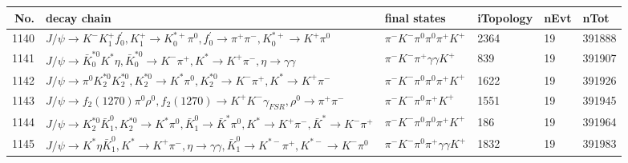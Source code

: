 \begin{table}[htbp] 
\begin{center}
\begin{small}
\begin{tabular}{rlllll}\hline\hline
 No. & decay chain & final states &  iTopology & nEvt & nTot \\\hline
1140&$J/\psi       \rightarrow K^{-}          K_1^{+}        f^{'}_{0}     , K_1^{+}         \rightarrow K_{0}^{*+}     \pi^{0}        , f^{'}_{0}      \rightarrow \pi^{+}        \pi^{-}        , K_{0}^{*+}      \rightarrow K^{+}          \pi^{0}        $&$\pi^{-}        K^{-}          \pi^{0}        \pi^{0}        \pi^{+}        K^{+}          $& 2364&   19&391888\\
1141&$J/\psi       \rightarrow \bar{K}_0^{*0}K^{*}          \eta          , \bar{K}_0^{*0} \rightarrow K^{-}          \pi^{+}        , K^{*}           \rightarrow K^{+}          \pi^{-}        , \eta           \rightarrow \gamma       \gamma       $&$\pi^{-}        K^{-}          \pi^{+}        \gamma       \gamma       K^{+}          $&  839&   19&391907\\
1142&$J/\psi       \rightarrow \pi^{0}        K_2^{*0}       K_2^{*0}       , K_2^{*0}        \rightarrow K^{*}          \pi^{0}        , K_2^{*0}        \rightarrow K^{-}          \pi^{+}        , K^{*}           \rightarrow K^{+}          \pi^{-}        $&$\pi^{-}        K^{-}          \pi^{0}        \pi^{0}        \pi^{+}        K^{+}          $& 1622&   19&391926\\
1143&$J/\psi       \rightarrow f_{2}(1270)    \pi^{0}        \rho^{0}      , f_{2}(1270)     \rightarrow K^{+}          K^{-}          \gamma_{FSR} , \rho^{0}       \rightarrow \pi^{+}        \pi^{-}        $&$\pi^{-}        K^{-}          \pi^{0}        \pi^{+}        K^{+}          $& 1551&   19&391945\\
1144&$J/\psi       \rightarrow K_2^{*0}       \bar{K}_1^{0} , K_2^{*0}        \rightarrow K^{*}          \pi^{0}        , \bar{K}_1^{0}  \rightarrow \bar{K}^{*}   \pi^{0}        , K^{*}           \rightarrow K^{+}          \pi^{-}        , \bar{K}^{*}    \rightarrow K^{-}          \pi^{+}        $&$\pi^{-}        K^{-}          \pi^{0}        \pi^{0}        \pi^{+}        K^{+}          $&  186&   19&391964\\
1145&$J/\psi       \rightarrow K^{*}          \eta          \bar{K}_1^{0} , K^{*}           \rightarrow K^{+}          \pi^{-}        , \eta           \rightarrow \gamma       \gamma       , \bar{K}_1^{0}  \rightarrow K^{*-}         \pi^{+}        , K^{*-}          \rightarrow K^{-}          \pi^{0}        $&$\pi^{-}        K^{-}          \pi^{0}        \pi^{+}        \gamma       \gamma       K^{+}          $& 1832&   19&391983\\

\end{tabular}
\end{small}
\end{center}
\end{table}
